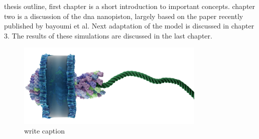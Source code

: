 thesis outline, first chapter is a short introduction to important concepts. chapter two
is a discussion of the dna nanopiston, largely based on the paper recently published by
bayoumi et al. Next adaptation of the model is discussed in chapter 3. The results of
these simulations are discussed in the last chapter.

\begin{figure}
\begin{center}
  \includegraphics[width=0.80\textwidth]{Figures/flagella2.png}
  \caption{write caption}
\end{center}
\end{figure}
